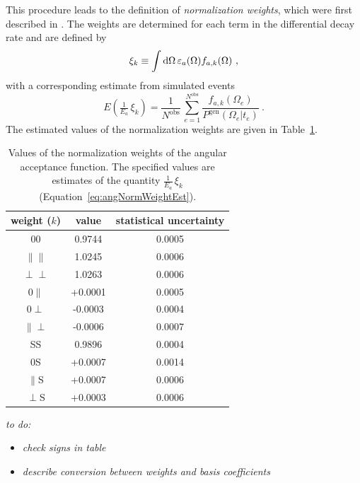 This procedure leads to the definition of \emph{normalization weights}, which were first described in \cite{duPree:2010}. The weights are
determined for each term in the differential decay rate and are defined by
\begin{equation}
  \label{eq:angNormWeightDef}
  \xi_k \equiv \int\mathrm{d}\Omega\, \varepsilon_a(\Omega) f_{a,k}(\Omega)\ ,
\end{equation}
with a corresponding estimate from simulated events
\begin{equation}
  \label{eq:angNormWeightEst}
  E\left( \tfrac{1}{E_a}\, \xi_k \right)
      = \frac{1}{N^\text{obs}}\, \sum_{e=1}^{N^\text{obs}}\frac{f_{a,k}(\Omega_e)}{P^\text{gen}(\Omega_e|t_e)}\ .
\end{equation}
The estimated values of the normalization weights are given in Table~\ref{tab:angNormWeights}.
\begin{table}[htbp]
  \centering
  \caption{Values of the normalization weights of the angular acceptance function.
           The specified values are estimates of the quantity $\tfrac{1}{E_a}\, \xi_k$ (Equation~\ref{eq:angNormWeightEst}).}
  \label{tab:angNormWeights}
  \begin{tabular}{ccc}
    \hline
    weight ($k$)  &  value  &  statistical uncertainty  \\
    \hline
    00                    &  0.9744   &  0.0005  \\
    $\parallel\parallel$  &  1.0245   &  0.0006  \\
    $\perp\perp$          &  1.0263   &  0.0006  \\
    0$\parallel$          &  +0.0001  &  0.0005  \\
    0$\perp$              &  -0.0003  &  0.0004  \\
    $\parallel\perp$      &  -0.0006  &  0.0007  \\
    SS                    &  0.9896   &  0.0004  \\
    0S                    &  +0.0007  &  0.0014  \\
    $\parallel$S          &  +0.0007  &  0.0006  \\
    $\perp$S              &  +0.0003  &  0.0006  \\
    \hline
  \end{tabular}
\end{table}

\emph{to do:}
\begin{itemize}
  \item \emph{check signs in table}
  \item \emph{describe conversion between weights and basis coefficients}
\end{itemize}
